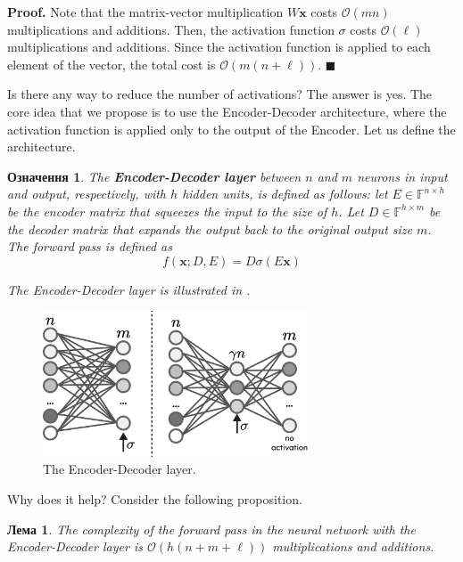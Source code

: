 \documentclass[12pt,a4paper,oneside]{book}
\theoremstyle{dplplain}
\newtheorem{lemma}[theorem]{Лема}%
\theoremstyle{dpldefinition}
\newtheorem{definition}[theorem]{Означення}%
\theoremstyle{dplremark}
\begin{document}
\textbf{Proof.} Note that the matrix-vector multiplication $W\mathbf{x}$ costs
$\mathcal{O}(mn)$ multiplications and additions. Then, the activation function
$\sigma$ costs $\mathcal{O}(\ell)$ multiplications and additions.
Since the activation function is applied to each element of the vector, the total
cost is $\mathcal{O}(m(n+\ell))$. $\blacksquare$

Is there any way to reduce the number of activations? The answer is yes. The 
core idea that we propose is to use the Encoder-Decoder architecture, where the
activation function is applied only to the output of the Encoder. Let us 
define the architecture.
\begin{definition}
    The \textbf{Encoder-Decoder layer} between $n$ and $m$ neurons in input and
    output, respectively, with $h$ hidden units, is defined as follows: let
    $E \in \mathbb{F}^{n \times h}$ be the encoder matrix that squeezes the
    input to the size of $h$. Let $D \in \mathbb{F}^{h \times m}$ be the decoder
    matrix that expands the output back to the original output size $m$. The
    forward pass is defined as 
    \begin{equation*}
        f(\mathbf{x}; D,E) = D\sigma(E\mathbf{x})
    \end{equation*}

    The Encoder-Decoder layer is illustrated in .
\end{definition}

\begin{figure}
    \centering
    \includegraphics[width=0.7\textwidth]{figures/ed.pdf}
    \caption{The Encoder-Decoder layer.}
    \label{figure:encoder-decoder}
\end{figure}

Why does it help? Consider the following proposition.
\begin{lemma}
    The complexity of the forward pass in the neural network with the
    Encoder-Decoder layer is $\mathcal{O}(h(n + m + \ell))$ multiplications and additions.
\end{lemma}
\end{document}
